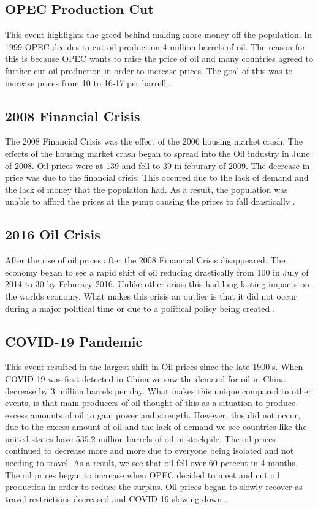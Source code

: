 \subsection{OPEC Production Cut}
This event highlights the greed behind making more money off the population. In 1999 OPEC decides to cut oil production 4 million barrels of oil. The  reason for this is because OPEC wants to raise the price of oil and many countries agreed to further cut oil production in order to increase prices. The goal of this was to increase prices from 10 to 16-17 per barrell \cite{opec1999}.
\subsection{2008 Financial Crisis}
The 2008 Financial Crisis was the effect of the 2006 housing market crash. The effects of the housing market crash began to spread into the Oil industry in June of 2008. Oil prices were at 139 and fell to 39 in feburary of 2009. The decrease in price was due to the financial crisis. This occured due to the lack of demand and the lack of money that the population had. As a result, the population was unable to afford the prices at the pump causing the prices to fall drastically \cite{crisis2008}.
\subsection{2016 Oil Crisis}
After the rise of oil prices after the 2008 Financial Crisis disappeared. The economy began to see a rapid shift of oil reducing drastically from 100 in July of 2014 to 30 by Feburary 2016. Unlike other crisis this had long lasting impacts on the worlds economy. What makes this crisis an outlier is that it did not occur during a major political time or due to a political policy being created \cite{imf2017}.
\subsection{COVID-19 Pandemic}
This event resulted in the largest shift in Oil prices since the late 1900's. When COVID-19 was first detected in China we saw the demand for oil in China decrease by 3 million barrels per day. What makes this unique compared to other events, is that main producers of oil thought of this as a situation to produce excess amounts of oil to gain power and strength. However, this did not occur, due to the excess amount of oil and the lack of demand we see countries like the united states have 535.2 million barrels of oil in stockpile. The oil prices continued to decrease more and more due to everyone being isolated and not needing to travel. As a result, we see that oil fell over 60 percent in 4 months. The oil prices began to increase when OPEC decided to meet and cut oil production in order to reduce the surplus. Oil prices began to slowly recover as travel restrictions decreased and COVID-19 slowing down \cite{covidoil}.
